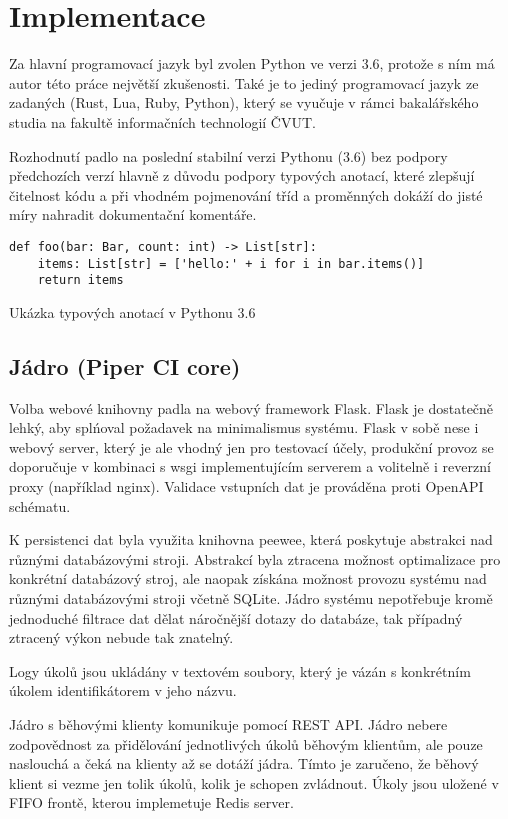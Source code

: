 \chapter{Implementace}

Za hlavní programovací jazyk byl zvolen Python ve verzi 3.6, protože s ním má autor této práce největší zkušenosti.
Také je to jediný programovací jazyk ze zadaných (Rust, Lua, Ruby, Python), který se vyučuje v rámci bakalářského studia na fakultě informačních technologií ČVUT.

Rozhodnutí padlo na poslední stabilní verzi Pythonu (3.6) bez podpory předchozích verzí hlavně z důvodu podpory typových anotací, které zlepšují čitelnost kódu a při vhodném pojmenování tříd a proměnných dokáží do jisté míry nahradit dokumentační komentáře.

\begin{listing}[ht]
\begin{verbatim}
def foo(bar: Bar, count: int) -> List[str]:
    items: List[str] = ['hello:' + i for i in bar.items()]
    return items
\end{verbatim}
\caption{Ukázka typových anotací v Pythonu 3.6}
\end{listing}

\section{Jádro (Piper CI core)}

Volba webové knihovny padla na webový framework Flask.
Flask je dostatečně lehký, aby splńoval požadavek na minimalismus systému.
Flask v sobě nese i webový server, který je ale vhodný jen pro testovací účely, produkční provoz se doporučuje v kombinaci s wsgi implementujícím serverem a volitelně i reverzní proxy (například nginx).
Validace vstupních dat je prováděna proti OpenAPI schématu.

K persistenci dat byla využita knihovna peewee, která poskytuje abstrakci nad různými databázovými stroji.
Abstrakcí byla ztracena možnost optimalizace pro konkrétní databázový stroj, ale naopak získána možnost provozu systému nad různými databázovými stroji včetně SQLite.
Jádro systému nepotřebuje kromě jednoduché filtrace dat dělat náročnější dotazy do databáze, tak případný ztracený výkon nebude tak znatelný.

Logy úkolů jsou ukládány v textovém soubory, který je vázán s konkrétním úkolem identifikátorem v jeho názvu.

Jádro s běhovými klienty komunikuje pomocí REST API.
Jádro nebere zodpovědnost za přidělování jednotlivých úkolů běhovým klientům, ale pouze naslouchá a čeká na klienty až se dotáží jádra.
Tímto je zaručeno, že běhový klient si vezme jen tolik úkolů, kolik je schopen zvládnout.
Úkoly jsou uložené v FIFO frontě, kterou implemetuje Redis server.

